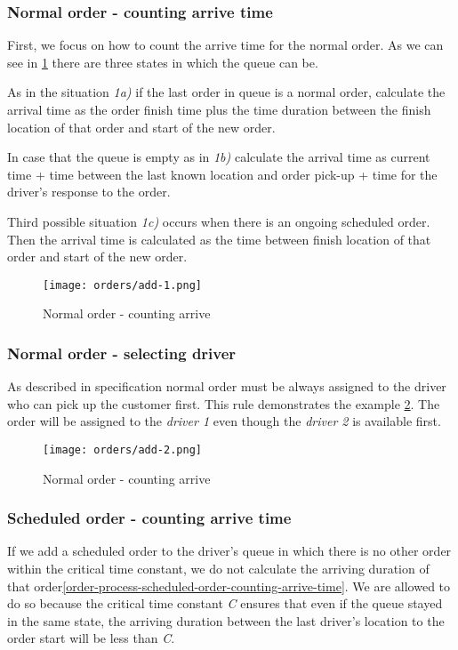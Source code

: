 	\subsubsection{Normal order - counting arrive time}
	
	First, we focus on how to count the arrive time for the normal order. As we can see in \ref{order-process-normal-order-counting-arrive} there are three states in which the queue can be.
	
	As in the situation \textit{1a)} if the last order in queue is a normal order, calculate the arrival time as the order finish time plus the time duration between the finish location of that order and start of the new order.
	
	In case that the queue is empty as in \textit{1b)} calculate the arrival time as current time + time between the last known location and order pick-up + time for the driver's response to the order.
	
	Third possible situation \textit{1c)} occurs when there is an ongoing scheduled order. Then the arrival time is calculated as the time between finish location of that order and start of the new order.
	
	
		\begin{figure}[h]\centering
			\texttt{[image: orders/add-1.png]}
			\caption{Normal order - counting arrive} 
			\label{order-process-normal-order-counting-arrive}
		\end{figure} 
	
	\subsubsection{Normal order - selecting driver}
	
		As described in specification normal order must be always assigned to the driver who can pick up the customer first. This rule demonstrates the example  \ref{order-process-normal-order-selecting-driver}. The order will be assigned to the \textit{driver 1} even though the \textit{driver 2} is available first.
		
			\begin{figure}[h]\centering
				\texttt{[image: orders/add-2.png]}
				\caption{Normal order - counting arrive} 
				\label{order-process-normal-order-selecting-driver}
			\end{figure} 
		
	\subsubsection{Scheduled order - counting arrive time}
		If we add a scheduled order to the driver's queue in which there is no other order within the critical time constant, we do not calculate the arriving duration of that order\ref{order-process-scheduled-order-counting-arrive-time}. We are allowed to do so because the critical time constant \textit{C} ensures that even if the queue stayed in the same state, the arriving duration between the last driver's location to the order start will be less than \textit{C}.
		
